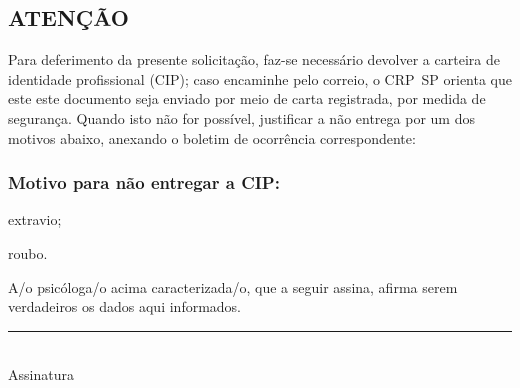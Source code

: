 \documentclass[openright, oneside, a4paper, article, brazil]{abntex2}
\begin{document}
\subsection*{ATENÇÃO}%
Para deferimento da presente solicitação, faz-se necessário devolver a carteira de identidade profissional (CIP); caso encaminhe pelo correio, o CRP~SP orienta que este este documento seja enviado por meio de carta registrada, por medida de segurança. Quando isto não for possível, justificar a não entrega por um dos motivos abaixo, anexando o boletim de ocorrência correspondente:

\subsubsection*{Motivo para não entregar a CIP:}%

\begin{todolist}[labelwidth=2em]
\item extravio;
\item roubo.
\end{todolist}

A/o psicóloga/o acima caracterizada/o, que a seguir assina, afirma serem verdadeiros os dados aqui informados.

\vspace*{1.618\baselineskip}
\centering
\rule{21em}{0.4pt}\\
Assinatura
\end{document}
